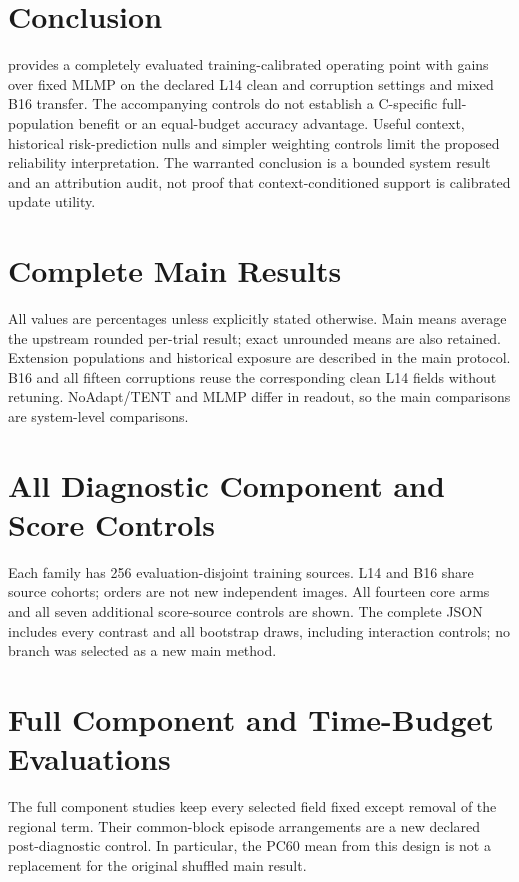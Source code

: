 \documentclass[10pt,twocolumn]{article}
\begin{document}
\section{Conclusion}
\method{} provides a completely evaluated training-calibrated operating point
with gains over fixed MLMP on the declared L14 clean and corruption settings
and mixed B16 transfer. The accompanying controls do not establish a
C-specific full-population benefit or an equal-budget accuracy advantage.
Useful context, historical risk-prediction nulls and simpler weighting
controls limit the proposed reliability interpretation. The warranted
conclusion is a bounded system result and an attribution audit, not proof
that context-conditioned support is calibrated update utility.

\FloatBarrier
\clearpage


\clearpage
\onecolumn
\appendix

\section{Complete Main Results}
All values are percentages unless explicitly stated otherwise. Main means
average the upstream rounded per-trial result; exact unrounded means are
also retained. Extension populations and historical exposure are described
in the main protocol. B16 and all fifteen corruptions reuse the corresponding
clean L14 fields without retuning. NoAdapt/TENT and MLMP differ in readout,
so the main comparisons are system-level comparisons.

\FloatBarrier

\FloatBarrier\clearpage

\section{All Diagnostic Component and Score Controls}
Each family has 256 evaluation-disjoint training sources. L14 and B16 share
source cohorts; orders are not new independent images. All fourteen core
arms and all seven additional score-source controls are shown. The complete
JSON includes every contrast and all bootstrap draws, including interaction
controls; no branch was selected as a new main method.


\FloatBarrier

\FloatBarrier\clearpage

\section{Full Component and Time-Budget Evaluations}
The full component studies keep every selected field fixed except removal
of the regional term. Their common-block episode arrangements are a new
declared post-diagnostic control. In particular, the PC60 mean from this
design is not a replacement for the original shuffled main result.


\FloatBarrier


\FloatBarrier\clearpage
\end{document}
